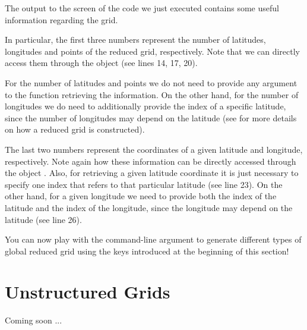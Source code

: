 The output to the screen of the code we just executed 
contains some useful information regarding the grid.

In particular, the first three numbers represent the 
number of latitudes, longitudes and points of the reduced
grid, respectively. Note that we can directly access them 
through the  object (see lines 14, 17, 20).
%
\begin{tipbox}
For the number of latitudes and points we do not need to provide
any argument to the function retrieving the information. On the 
other hand, for the number of longitudes we do need to additionally 
provide the index of a specific latitude, since the number of 
longitudes may depend on the latitude (see  
for more details on how a reduced grid is constructed). 
\end{tipbox}
%
The last two numbers represent the coordinates of a given 
latitude and longitude, respectively. Note again how these 
information can be directly accessed through the object 
. 
Also, for retrieving a given latitude coordinate it is just 
necessary to specify one index that refers to that particular 
latitude (see line 23). On the other hand, for a given longitude 
we need to provide both the index of the latitude and the index 
of the longitude, since the longitude may depend on the latitude 
(see line 26).

You can now play with the command-line argument to generate 
different types of global reduced grid using the keys introduced 
at the beginning of this section!



\section{Unstructured Grids}
Coming soon ...